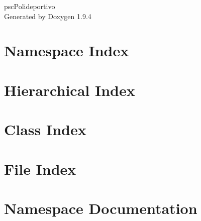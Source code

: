 \documentclass[twoside]{book}
\newcommand{\+}{\discretionary{\mbox{\scriptsize$\hookleftarrow$}}{}{}}
\newcommand{\clearemptydoublepage}{%
    \newpage{\pagestyle{empty}\cleardoublepage}%
  }
\begin{document}
  \raggedbottom
    \hypersetup{pageanchor=false,
                bookmarksnumbered=true,
                pdfencoding=unicode
               }
  \begin{titlepage}
  \vspace*{7cm}
  \begin{center}%
  {\Large psc\+Polideportivo}\\
  \vspace*{1cm}
  {\large Generated by Doxygen 1.9.4}\\
  \end{center}
  \end{titlepage}
  \clearemptydoublepage
  \tableofcontents
  \clearemptydoublepage
  \hypersetup{pageanchor=true}
\chapter{Namespace Index}

\chapter{Hierarchical Index}

\chapter{Class Index}

\chapter{File Index}

\chapter{Namespace Documentation}



\end{document}
